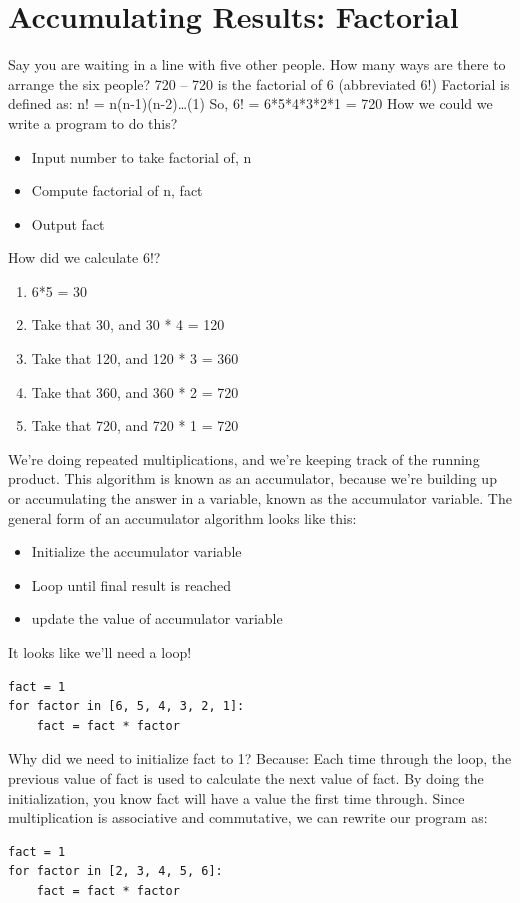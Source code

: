 \documentclass[12pt,a4paper,final,twoside,titlepage]{book}
\begin{document}
\section{Accumulating Results: Factorial}
Say you are waiting in a line with five other people. How many ways are there to arrange the six people?
720 -- 720 is the factorial of 6 (abbreviated 6!)
Factorial is defined as:
n! = n(n-1)(n-2)…(1)
So, 6! = 6*5*4*3*2*1 = 720
How we could we write a program to do this?
\begin{itemize}
\item Input number to take factorial of, n
\item Compute factorial of n, fact
\item Output fact
\end{itemize}
How did we calculate 6!?
\begin{enumerate}
\item 6*5 = 30
\item Take that 30, and 30 * 4 = 120
\item Take that 120, and 120 * 3 = 360
\item Take that 360, and 360 * 2 = 720
\item Take that 720, and 720 * 1 = 720
\end{enumerate}
We’re doing repeated multiplications, and we’re keeping track of the running product. This algorithm is known as an accumulator, because we’re building up or accumulating the answer in a variable, known as the accumulator variable.
The general form of an accumulator algorithm looks like this:
\begin{itemize}
\item Initialize the accumulator variable
\item Loop until final result is reached
\item update the value of accumulator variable
\end{itemize}
It looks like we’ll need a loop!
\lstset{language=Python, tabsize=4}
\begin{lstlisting}
fact = 1
for factor in [6, 5, 4, 3, 2, 1]:
	fact = fact * factor
\end{lstlisting}
Why did we need to initialize fact to 1? Because: Each time through the loop, the previous value of fact is used to calculate the next value of fact. By doing the initialization, you know fact will have a value the first time through. Since multiplication is associative and commutative, we can rewrite our program as:
\lstset{language=Python, tabsize=4}
\begin{lstlisting}
fact = 1
for factor in [2, 3, 4, 5, 6]:
	fact = fact * factor
\end{lstlisting}
\end{document}
